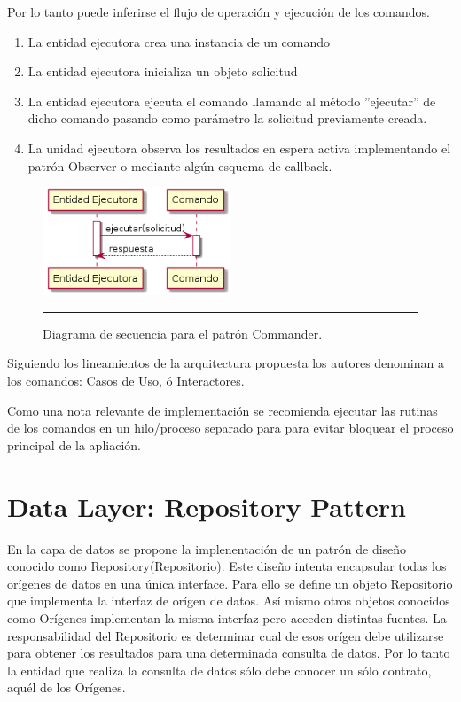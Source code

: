 Por lo tanto puede inferirse el flujo de operación y ejecución de los comandos.

\begin{enumerate}
\item La entidad ejecutora crea una instancia de un comando 
\item La entidad ejecutora inicializa un objeto solicitud
\item La entidad ejecutora ejecuta el comando llamando al método ''ejecutar'' de dicho comando pasando como parámetro la solicitud previamente creada.
\item La unidad ejecutora observa los resultados en espera activa implementando el patrón Observer o mediante algún esquema de callback.
\end{enumerate}

\begin{figure}[htbp]
	\centering
	\includegraphics[width=0.5\textwidth]{Figures/uml_commander_sequence.png}
	\rule{35em}{1pt}
	\caption[MVP Components]{Diagrama de secuencia para el patrón Commander.}
	\label{fig:uml_commander_sequence}
\end{figure}

Siguiendo los lineamientos de la arquitectura propuesta los autores denominan a los comandos: Casos de Uso, ó Interactores.

Como una nota relevante de implementación se recomienda ejecutar las rutinas de los comandos en un hilo/proceso separado para para evitar bloquear el proceso principal de la apliación.

\section{Data Layer: Repository Pattern}
En la capa de datos se propone la implenentación de un patrón de diseño conocido como Repository(Repositorio). Este diseño intenta encapsular todas los orígenes de datos en una única interface. Para ello se define un objeto Repositorio que implementa la interfaz de orígen de datos. Así mismo otros objetos conocidos como Orígenes implementan la misma interfaz pero acceden distintas fuentes. La responsabilidad del Repositorio es determinar cual de esos orígen debe utilizarse para obtener los resultados para una determinada consulta de datos.
Por lo tanto la entidad que realiza la consulta de datos sólo debe conocer un sólo contrato, aquél de los Orígenes.
% 
